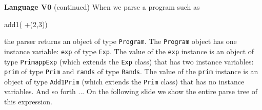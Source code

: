\begin{minipage}[t]{\sw}
\slidenumber
\LARGE
{\bf Language V0} (continued)\exx
When we parse a program such as
\begin{qv}
add1( +(2,3))
\end{qv}
the parser returns an object of type \verb'Program'.
The \verb'Program' object
has one instance variable: \verb'exp' of type \verb'Exp'.
The value of the \verb'exp' instance is an object
of type \verb'PrimappExp' (which extends the \verb'Exp' class)
that has two instance variables:
\verb'prim' of type \verb'Prim' and \verb'rands' of type \verb'Rands'.
The value of the \verb'prim' instance
is an object of type \verb'Add1Prim'
(which extends the \verb'Prim' class)
that has no instance variables.
And so forth ...\exx
On the following slide we show the entire parse tree of this expression.
\end{minipage}
\clearpage

